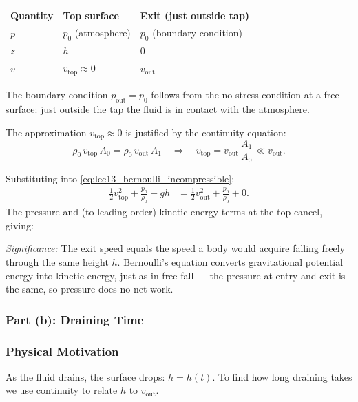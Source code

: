 \documentclass[../main.tex]{subfiles}
\begin{document}
\begin{center}
\renewcommand{\arraystretch}{1.4}
\begin{tabular}{lll}
\toprule
Quantity & Top surface & Exit (just outside tap) \\
\midrule
$p$ & $p_0$ (atmosphere) & $p_0$ (boundary condition) \\
$z$ & $h$ & $0$ \\
$v$ & $v_{\mathrm{top}}\approx 0$ & $v_{\mathrm{out}}$ \\
\bottomrule
\end{tabular}
\end{center}

The boundary condition $p_{\mathrm{out}}=p_0$ follows from the no-stress condition at a free surface: just outside the tap the fluid is in contact with the atmosphere.

The approximation $v_{\mathrm{top}}\approx 0$ is justified by the continuity equation:
\begin{equation}
  \rho_0\,v_{\mathrm{top}}\,A_0 = \rho_0\,v_{\mathrm{out}}\,A_1
  \quad\Longrightarrow\quad
  v_{\mathrm{top}} = v_{\mathrm{out}}\,\frac{A_1}{A_0} \ll v_{\mathrm{out}}.
\end{equation}

Substituting into \eqref{eq:lec13_bernoulli_incompressible}:
\begin{align}
  \frac{1}{2}v_{\mathrm{top}}^2 + \frac{p_0}{\rho_0} + gh
  &=
  \frac{1}{2}v_{\mathrm{out}}^2 + \frac{p_0}{\rho_0} + 0.
\end{align}
The pressure and (to leading order) kinetic-energy terms at the top cancel, giving:

\textit{Significance:} The exit speed equals the speed a body would acquire falling freely through the same height $h$. Bernoulli's equation converts gravitational potential energy into kinetic energy, just as in free fall — the pressure at entry and exit is the same, so pressure does no net work.

\subsubsection{Part (b): Draining Time}

\subsubsection*{Physical Motivation}
As the fluid drains, the surface drops: $h=h(t)$. To find how long draining takes we use continuity to relate $\dot{h}$ to $v_{\mathrm{out}}$.
\end{document}
